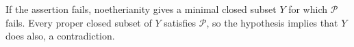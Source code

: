 If the assertion fails, noetherianity gives a minimal closed subset $Y$ for which $\mathcal P$ fails. Every proper closed subset of $Y$ satisfies $\mathcal P$, so the hypothesis implies that $Y$ does also, a contradiction.
